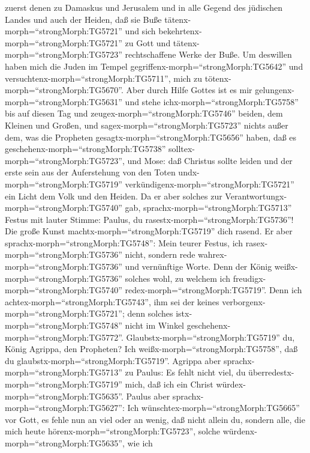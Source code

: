 zuerst denen zu Damaskus und Jerusalem und in alle Gegend des jüdischen
Landes und auch der Heiden, daß sie Buße
tätenx-morph=``strongMorph:TG5721'' und sich
bekehrtenx-morph=``strongMorph:TG5721'' zu Gott und
tätenx-morph=``strongMorph:TG5723'' rechtschaffene Werke der Buße.
 Um deswillen haben mich die Juden im Tempel
gegriffenx-morph=``strongMorph:TG5642'' und
versuchtenx-morph=``strongMorph:TG5711'', mich zu
tötenx-morph=``strongMorph:TG5670''.  Aber durch Hilfe
Gottes ist es mir gelungenx-morph=``strongMorph:TG5631'' und stehe
ichx-morph=``strongMorph:TG5758'' bis auf diesen Tag und
zeugex-morph=``strongMorph:TG5746'' beiden, dem Kleinen und Großen, und
sagex-morph=``strongMorph:TG5723'' nichts außer dem, was die Propheten
gesagtx-morph=``strongMorph:TG5656'' haben, daß es
geschehenx-morph=``strongMorph:TG5738''
solltex-morph=``strongMorph:TG5723'', und Mose:  daß
Christus sollte leiden und der erste sein aus der Auferstehung von den
Toten undx-morph=``strongMorph:TG5719''
verkündigenx-morph=``strongMorph:TG5721'' ein Licht dem Volk und den
Heiden.  Da er aber solches zur
Verantwortungx-morph=``strongMorph:TG5740'' gab,
sprachx-morph=``strongMorph:TG5713'' Festus mit lauter Stimme: Paulus,
du rasestx-morph=``strongMorph:TG5736''! Die große Kunst
machtx-morph=``strongMorph:TG5719'' dich rasend.  Er aber
sprachx-morph=``strongMorph:TG5748'': Mein teurer Festus, ich
rasex-morph=``strongMorph:TG5736'' nicht, sondern rede
wahrex-morph=``strongMorph:TG5736'' und vernünftige Worte. 
Denn der König weißx-morph=``strongMorph:TG5736'' solches wohl, zu
welchem ich freudigx-morph=``strongMorph:TG5740''
redex-morph=``strongMorph:TG5719''. Denn ich
achtex-morph=``strongMorph:TG5743'', ihm sei der keines
verborgenx-morph=``strongMorph:TG5721''; denn solches
istx-morph=``strongMorph:TG5748'' nicht im Winkel
geschehenx-morph=``strongMorph:TG5772''. 
Glaubstx-morph=``strongMorph:TG5719'' du, König Agrippa, den Propheten?
Ich weißx-morph=``strongMorph:TG5758'', daß du
glaubstx-morph=``strongMorph:TG5719''.  Agrippa aber
sprachx-morph=``strongMorph:TG5713'' zu Paulus: Es fehlt nicht viel, du
überredestx-morph=``strongMorph:TG5719'' mich, daß ich ein Christ
würdex-morph=``strongMorph:TG5635''.  Paulus aber
sprachx-morph=``strongMorph:TG5627'': Ich
wünschtex-morph=``strongMorph:TG5665'' vor Gott, es fehle nun an viel
oder an wenig, daß nicht allein du, sondern alle, die mich heute
hörenx-morph=``strongMorph:TG5723'', solche
würdenx-morph=``strongMorph:TG5635'', wie ich

